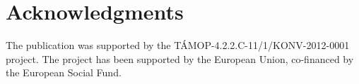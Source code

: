 \documentclass{acm_proc_article-me}
\begin{document}

\section{Acknowledgments}

The publication was supported by the T\'AMOP-4.2.2.C-11/1/KONV-2012-0001 project. The project has been supported by the European Union, co-financed by the European Social Fund.



\end{document}
